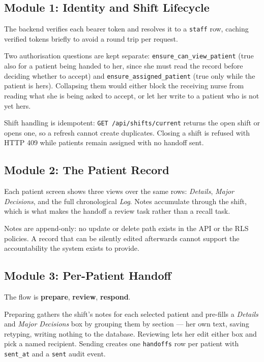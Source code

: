 \documentclass{tietreport}
\begin{document}
\subsection{Module 1: Identity and Shift Lifecycle}

The backend verifies each bearer token and resolves it to a
\texttt{staff} row, caching verified tokens briefly to avoid
a round trip per request.

Two authorisation questions are kept separate:
\texttt{ensure\_can\_view\_patient} (true also for a patient
being handed to her, since she must read the record before
deciding whether to accept) and
\texttt{ensure\_assigned\_patient} (true only while the
patient is hers). Collapsing them would either block the
receiving nurse from reading what she is being asked to
accept, or let her write to a patient who is not yet hers.

Shift handling is idempotent: \texttt{GET
/api/shifts/current} returns the open shift or opens one, so
a refresh cannot create duplicates. Closing a shift is
refused with HTTP 409 while patients remain assigned with no
handoff sent.

\subsection{Module 2: The Patient Record}

Each patient screen shows three views over the same rows:
\emph{Details}, \emph{Major Decisions}, and the full
chronological \emph{Log}. Notes accumulate through the
shift, which is what makes the handoff a review task rather
than a recall task.

Notes are append-only: no update or delete path exists in
the API or the RLS policies. A record that can be silently
edited afterwards cannot support the accountability the
system exists to provide.

\subsection{Module 3: Per-Patient Handoff}

The flow is \textbf{prepare}, \textbf{review},
\textbf{respond}.

Preparing gathers the shift's notes for each selected
patient and pre-fills a \emph{Details} and \emph{Major
Decisions} box by grouping them by section --- her own text,
saving retyping, writing nothing to the database. Reviewing
lets her edit either box and pick a named recipient. Sending
creates one \texttt{handoffs} row per patient with
\texttt{sent\_at} and a \texttt{sent} audit event.
\end{document}
